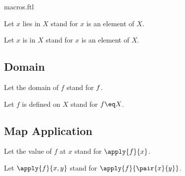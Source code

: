 \documentclass{naproche-library}
\begin{document}
\begin{smodule}{macros.ftl}
\begin{forthel}
  Let $x$ lies in $X$ stand for $x$ is an element of $X$.

  Let $x$ is in $X$ stand for $x$ is an element of $X$.
\end{forthel}

\subsection{Domain}

\begin{forthel}
  Let the domain of $f$ stand for $\relax{f}$.

  Let $f$ is defined on $X$ stand for $\dom{f}\eq X$.
\end{forthel}

\subsection{Map Application}

\begin{forthel}
  Let the value of $f$ at $x$ stand for $\apply{f}{x}$.

  Let $\apply{f}{x,y}$ stand for $\apply{f}{\pair{x}{y}}$.
\end{forthel}
\end{smodule}
\end{document}
